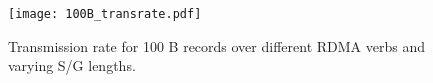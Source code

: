 \begin{figure}[t]
\texttt{[image: 100B\_transrate.pdf]}
\caption{Transmission rate for 100 B records over different RDMA verbs and 
varying S/G lengths.}
\label{fig:100B_transrate}
\end{figure}
